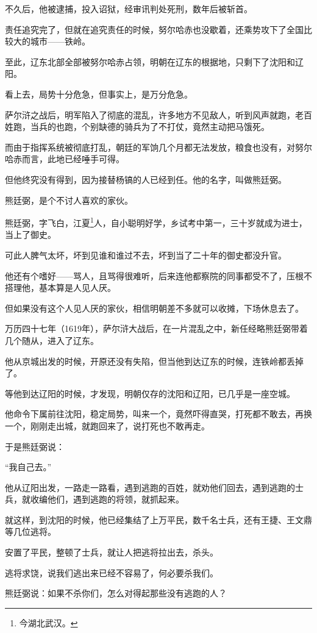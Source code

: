 \begin{multicols}{\theparacolNo}
		不久后，他被逮捕，投入诏狱，经审讯判处死刑，数年后被斩首。

		责任追究完了，但就在追究责任的时候，努尔哈赤也没歇着，还乘势攻下了全国比较大的城市——铁岭。

		至此，辽东北部全部被努尔哈赤占领，明朝在辽东的根据地，只剩下了沈阳和辽阳。

		看上去，局势十分危急，但事实上，是万分危急。

		萨尔浒之战后，明军陷入了彻底的混乱，许多地方不见敌人，听到风声就跑，老百姓跑，当兵的也跑，个别缺德的骑兵为了不打仗，竟然主动把马饿死。

		而由于指挥系统被彻底打乱，朝廷的军饷几个月都无法发放，粮食也没有，对努尔哈赤而言，此地已经唾手可得。

		但他终究没有得到，因为接替杨镐的人已经到任。他的名字，叫做熊廷弼。

		熊廷弼，是个不讨人喜欢的家伙。

		熊廷弼，字飞白，江夏\footnote{今湖北武汉。}人，自小聪明好学，乡试考中第一，三十岁就成为进士，当上了御史。

		可此人脾气太坏，坏到见谁和谁过不去，坏到当了二十年的御史都没升官。

		他还有个嗜好——骂人，且骂得很难听，后来连他都察院的同事都受不了，压根不搭理他，基本算是人见人厌。

		但如果没有这个人见人厌的家伙，相信明朝差不多就可以收摊，下场休息去了。

		万历四十七年（1619年），萨尔浒大战后，在一片混乱之中，新任经略熊廷弼带着几个随从，进入了辽东。

		他从京城出发的时候，开原还没有失陷，但当他到达辽东的时候，连铁岭都丢掉了。

		等他到达辽阳的时候，才发现，明朝仅存的沈阳和辽阳，已几乎是一座空城。

		他命令下属前往沈阳，稳定局势，叫来一个，竟然吓得直哭，打死都不敢去，再换一个，刚刚走出城，就跑回来了，说打死也不敢再走。

		于是熊廷弼说：

		“我自己去。”

		他从辽阳出发，一路走一路看，遇到逃跑的百姓，就劝他们回去，遇到逃跑的士兵，就收编他们，遇到逃跑的将领，就抓起来。

		就这样，到沈阳的时候，他已经集结了上万平民，数千名士兵，还有王捷、王文鼎等几位逃将。

		安置了平民，整顿了士兵，就让人把逃将拉出去，杀头。

		逃将求饶，说我们逃出来已经不容易了，何必要杀我们。

		熊廷弼说：如果不杀你们，怎么对得起那些没有逃跑的人？


\end{multicols}
